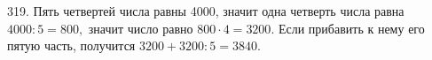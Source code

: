 319. Пять четвертей числа равны 4000, значит одна четверть числа равна $4000:5=800,$ значит число равно $800\cdot4=3200.$ Если прибавить к нему его пятую часть, получится $3200+3200:5=3840.$\\
